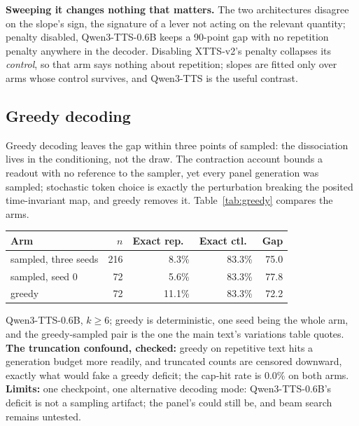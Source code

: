 \noindent\textbf{Sweeping it changes nothing that matters.} The two architectures disagree on
the slope's sign, the signature of a lever not acting on the relevant quantity; penalty
disabled, Qwen3-TTS-0.6B keeps a 90-point gap with no repetition penalty anywhere in the
decoder. Disabling XTTS-v2's penalty collapses its \emph{control}, so that arm says nothing
about repetition; slopes are fitted only over arms whose control survives, and Qwen3-TTS is the
useful contrast.

\subsection{Greedy decoding}
\label{sec:greedy}

Greedy decoding leaves the gap within three points of sampled: the dissociation lives in the
conditioning, not the draw. The contraction account bounds a readout with no reference to the
sampler, yet every panel generation was sampled; stochastic token choice is exactly the
perturbation breaking the posited time-invariant map, and greedy removes it. Table~\ref{tab:greedy}
compares the arms.

\par\medskip\noindent\begin{minipage}{\columnwidth}
\label{tab:greedy}
\centering
\begin{tabular}{@{}lrrrr@{}}
\toprule
Arm & $n$ & Exact rep.\ & Exact ctl.\ & Gap \\
\midrule
sampled, three seeds & 216 & 8.3\%  & 83.3\% & 75.0 \\
sampled, seed 0      &  72 & 5.6\%  & 83.3\% & 77.8 \\
greedy               &  72 & 11.1\% & 83.3\% & 72.2 \\
\bottomrule
\end{tabular}
\end{minipage}\par\medskip


\noindent Qwen3-TTS-0.6B, $k\ge6$; greedy is deterministic, one seed being the whole arm, and
the greedy-sampled pair is the one the main text's variations table quotes. \textbf{The
truncation confound, checked:} greedy on repetitive text hits a generation budget more readily,
and truncated counts are censored downward, exactly what would fake a greedy deficit; the
cap-hit rate is 0.0\% on both arms. \textbf{Limits:} one checkpoint, one alternative decoding
mode: Qwen3-TTS-0.6B's deficit is not a sampling artifact; the panel's could still be, and beam
search remains untested.

